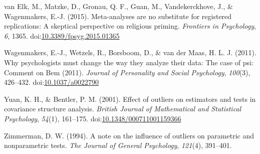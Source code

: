 \documentclass[english,man]{apa6}
\theoremstyle{definition}
\theoremstyle{definition}
\theoremstyle{definition}
\theoremstyle{remark}
\begin{document}
\hypertarget{ref-VanElk2015}{}
van Elk, M., Matzke, D., Gronau, Q. F., Guan, M., Vandekerckhove, J., \&
Wagenmakers, E.-J. (2015). Meta-analyses are no substitute for
registered replications: A skeptical perspective on religious priming.
\emph{Frontiers in Psychology}, \emph{6}, 1365.
doi:\href{https://doi.org/10.3389/fpsyg.2015.01365}{10.3389/fpsyg.2015.01365}

\hypertarget{ref-Wagenmakers2011a}{}
Wagenmakers, E.-J., Wetzels, R., Borsboom, D., \& van der Maas, H. L. J.
(2011). Why psychologists must change the way they analyze their data:
The case of psi: Comment on Bem (2011). \emph{Journal of Personality and
Social Psychology}, \emph{100}(3), 426--432.
doi:\href{https://doi.org/10.1037/a0022790}{10.1037/a0022790}

\hypertarget{ref-Yuan2001}{}
Yuan, K. H., \& Bentler, P. M. (2001). Effect of outliers on estimators
and tests in covariance structure analysis. \emph{British Journal of
Mathematical and Statistical Psychology}, \emph{54}(1), 161--175.
doi:\href{https://doi.org/10.1348/000711001159366}{10.1348/000711001159366}

\hypertarget{ref-Zimmerman1994}{}
Zimmerman, D. W. (1994). A note on the influence of outliers on
parametric and nonparametric tests. \emph{The Journal of General
Psychology}, \emph{121}(4), 391--401.
\end{document}
